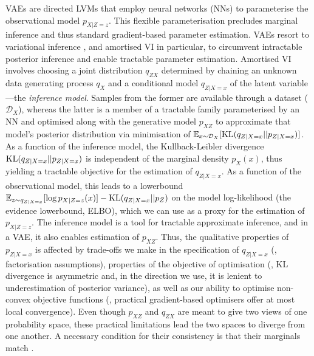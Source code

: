 VAEs \citep{Kingma+2014:VAE,RezendeEtAl14VAE} are directed LVMs that employ neural networks (NNs) to parameterise the observational model $p_{X|Z=z}$. This flexible parameterisation precludes marginal inference and thus standard gradient-based parameter estimation. VAEs resort to variational inference \citep[VI;][]{Jordan+1999:VI}, and amortised VI \citep{Kingma+2014:VAE} in particular, to circumvent intractable posterior inference and enable tractable parameter estimation. %
Amortised VI involves choosing a joint distribution $q_{ZX}$  determined by chaining an unknown data generating process $q_X$ %
and a conditional model $q_{Z|X=x}$ of the latent variable---the \emph{inference model}. Samples from the former are available through a dataset ($\mathcal D_X$), whereas the latter is a member of a tractable family parameterised by an NN and optimised along with the generative model $p_{XZ}$ to approximate that model's posterior distribution via minimisation of $\mathbb E_{x \sim \mathcal D_X}[\operatorname{KL}(q_{Z|X=x}||p_{Z|X=x})]$.
As a function of the inference model, the Kullback-Leibler divergence $\operatorname{KL}(q_{Z|X=x}||p_{Z|X=x})$ is independent of the  marginal density $p_X(x)$, thus yielding a tractable objective for the estimation of $q_{Z|X=x}$. As a function of the observational model, this leads to a lowerbound $\mathbb E_{z\sim q_{Z|X=x}}[\log p_{X|Z=z}(x)] - \operatorname{KL}(q_{Z|X=x}||p_Z)$ on the model log-likelihood (the evidence lowerbound, ELBO), which we can use as a proxy for the estimation of $p_{X|Z=z}$.
The inference model is a tool for tractable approximate inference, and in a VAE, it also enables estimation of $p_{XZ}$. %
Thus, the qualitative properties of $p_{Z|X=x}$ is affected by trade-offs we make in the specification of $q_{Z|X=x}$ (\eg, factorisation assumptions), properties of the objective of optimisation (\eg, KL divergence is asymmetric and, in the direction we use, it is lenient to underestimation of posterior variance), as well as our ability to optimise non-convex objective functions (\eg, practical gradient-based optimisers offer at most local convergence).
Even though $p_{XZ}$ and $q_{ZX}$ are meant to give two views of one probability space, these practical limitations lead the two spaces to diverge from one another. 
A necessary condition for their consistency is that their marginals match \citep{Song2020Understanding}. %
